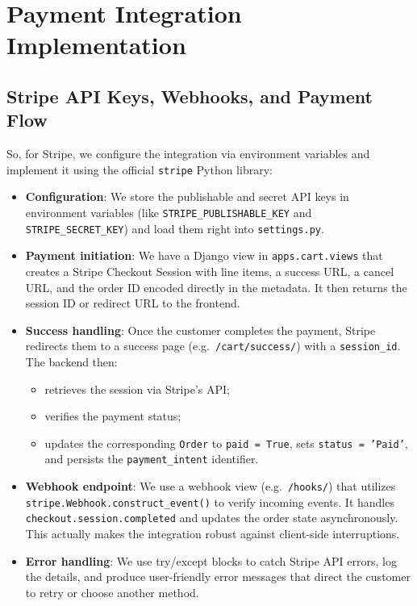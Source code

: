 \section{Payment Integration Implementation}

\subsection{Stripe API Keys, Webhooks, and Payment Flow}

So, for Stripe, we configure the integration via environment variables and implement it using the official \texttt{stripe} Python library:

\begin{itemize}
  \item \textbf{Configuration}: We store the publishable and secret API keys in environment variables (like \texttt{STRIPE\_PUBLISHABLE\_KEY} and \texttt{STRIPE\_SECRET\_KEY}) and load them right into \texttt{settings.py}.
  \item \textbf{Payment initiation}: We have a Django view in \texttt{apps.cart.views} that creates a Stripe Checkout Session with line items, a success URL, a cancel URL, and the order ID encoded directly in the metadata. It then returns the session ID or redirect URL to the frontend.
  \item \textbf{Success handling}: Once the customer completes the payment, Stripe redirects them to a success page (e.g.\ \texttt{/cart/success/}) with a \texttt{session\_id}. The backend then:
  \begin{itemize}
    \item retrieves the session via Stripe’s API;
    \item verifies the payment status;
    \item updates the corresponding \texttt{Order} to \texttt{paid = True}, sets \texttt{status = 'Paid'}, and persists the \texttt{payment\_intent} identifier.
  \end{itemize}
  \item \textbf{Webhook endpoint}: We use a webhook view (e.g.\ \texttt{/hooks/}) that utilizes \texttt{stripe.Webhook.construct\_event()} to verify incoming events. It handles \texttt{checkout.session.completed} and updates the order state asynchronously. This actually makes the integration robust against client-side interruptions.
  \item \textbf{Error handling}: We use try/except blocks to catch Stripe API errors, log the details, and produce user-friendly error messages that direct the customer to retry or choose another method.
\end{itemize}

